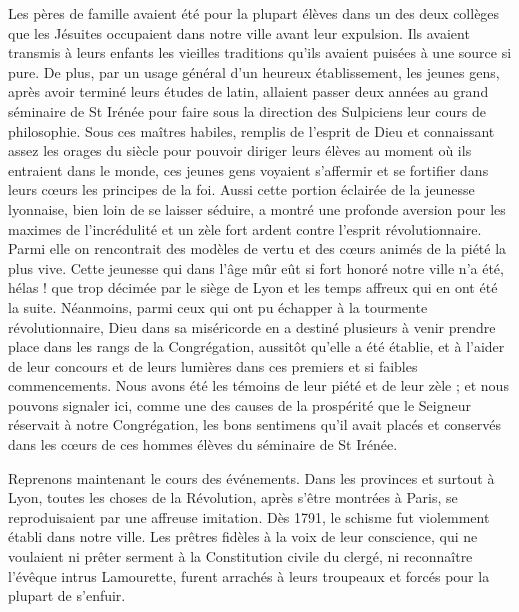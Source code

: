 Les pères de famille avaient été pour la plupart élèves dans un des deux collèges que les Jésuites occupaient dans notre ville avant leur expulsion. Ils avaient transmis à leurs enfants les vieilles traditions qu'ils avaient puisées à une source si pure. De plus, par un usage général d'un heureux établissement, les jeunes gens, après avoir terminé leurs études de latin, allaient passer deux années au grand séminaire de St Irénée pour faire sous la direction des Sulpiciens leur cours de philosophie. Sous ces maîtres habiles, remplis de l'esprit de Dieu et connaissant assez
les orages du siècle pour pouvoir diriger leurs élèves au moment où ils entraient dans le monde, ces jeunes gens voyaient s'affermir et se fortifier dans leurs cœurs les principes de la foi. Aussi cette portion éclairée de la jeunesse lyonnaise, bien loin de se laisser séduire, a montré une profonde aversion pour les maximes de l'incrédulité et un zèle fort ardent contre l'esprit révolutionnaire. Parmi elle on rencontrait des modèles de vertu et des cœurs animés de la piété la plus vive. Cette jeunesse qui dans l'âge mûr eût si fort honoré notre ville n'a été, hélas ! que trop décimée par le siège de Lyon et les temps affreux qui en ont été la suite. Néanmoins, parmi ceux qui ont pu échapper à la tourmente révolutionnaire, Dieu dans sa miséricorde en a destiné plusieurs à venir prendre place dans les rangs de la Congrégation, aussitôt qu'elle a été établie, et à l'aider de leur concours et de leurs lumières dans ces premiers et si faibles commencements. Nous avons été les témoins de leur piété et de leur zèle ; et nous pouvons signaler ici, comme une des causes de la prospérité que le Seigneur réservait à notre Congrégation, les bons sentimens qu'il avait placés et conservés dans les cœurs de ces hommes élèves du séminaire de St Irénée.

Reprenons maintenant le cours des événements. Dans les provinces et surtout à Lyon, toutes les choses de la Révolution, après s'être montrées à Paris, se reproduisaient par une affreuse imitation. Dès 1791, le schisme fut violemment établi dans notre ville. Les prêtres fidèles
à la voix de leur conscience, qui ne voulaient ni prêter serment à la Constitution civile du clergé, ni reconnaître l'évêque intrus Lamourette, furent arrachés à leurs troupeaux et forcés pour la plupart de s'enfuir.

